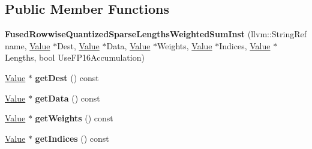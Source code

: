 \subsection*{Public Member Functions}
\begin{DoxyCompactItemize}
\item 
\mbox{\label{classglow_1_1_fused_rowwise_quantized_sparse_lengths_weighted_sum_inst_a56e96bd8474ae83fd788f0ce511190fa}} 
{\bfseries Fused\+Rowwise\+Quantized\+Sparse\+Lengths\+Weighted\+Sum\+Inst} (llvm\+::\+String\+Ref name, \hyperlink{classglow_1_1_value}{Value} $\ast$Dest, \hyperlink{classglow_1_1_value}{Value} $\ast$Data, \hyperlink{classglow_1_1_value}{Value} $\ast$Weights, \hyperlink{classglow_1_1_value}{Value} $\ast$Indices, \hyperlink{classglow_1_1_value}{Value} $\ast$Lengths, bool Use\+F\+P16\+Accumulation)
\item 
\mbox{\label{classglow_1_1_fused_rowwise_quantized_sparse_lengths_weighted_sum_inst_a25b238f3eccf7400840f457f2c77afe1}} 
\hyperlink{classglow_1_1_value}{Value} $\ast$ {\bfseries get\+Dest} () const
\item 
\mbox{\label{classglow_1_1_fused_rowwise_quantized_sparse_lengths_weighted_sum_inst_a4a6cb1c22e9fc67b21f195635c830cc8}} 
\hyperlink{classglow_1_1_value}{Value} $\ast$ {\bfseries get\+Data} () const
\item 
\mbox{\label{classglow_1_1_fused_rowwise_quantized_sparse_lengths_weighted_sum_inst_a3fb3d880fd87effd895d09907893f0ce}} 
\hyperlink{classglow_1_1_value}{Value} $\ast$ {\bfseries get\+Weights} () const
\item 
\mbox{\label{classglow_1_1_fused_rowwise_quantized_sparse_lengths_weighted_sum_inst_a880edcba4f8d53f1bce5378ca71bccbf}} 
\hyperlink{classglow_1_1_value}{Value} $\ast$ {\bfseries get\+Indices} () const
\item 
\mbox{\label{classglow_1_1_fused_rowwise_quantized_sparse_lengths_weighted_sum_inst_a397a0e4fa065ae87e79b725ff0d31fa9}} 

\end{DoxyCompactItemize}
